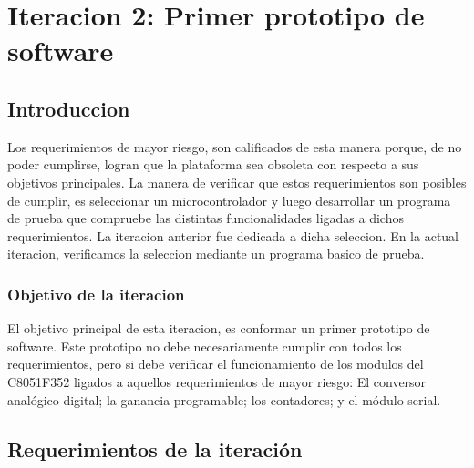 \chapter{Iteracion 2: Primer prototipo de software} %
\label{cha:iteracion_2}

\section{Introduccion} %
\label{it2:sec:introduccion}


Los requerimientos de mayor riesgo, son calificados de esta manera porque, de no poder cumplirse, logran que la plataforma sea obsoleta con respecto a sus objetivos principales. La manera de verificar que estos requerimientos son posibles de cumplir, es seleccionar un microcontrolador y luego desarrollar un programa de prueba que compruebe las distintas funcionalidades ligadas a dichos requerimientos. La iteracion anterior fue dedicada a dicha seleccion. En la actual iteracion, verificamos la seleccion mediante un programa basico de prueba.

\subsection{Objetivo de la iteracion} %
\label{sub:objetivo_de_la_iteracion}

El objetivo principal de esta iteracion, es conformar un primer prototipo de software. Este prototipo no debe necesariamente cumplir con todos los requerimientos, pero si debe verificar el funcionamiento de los modulos del C8051F352 ligados a aquellos requerimientos de mayor riesgo: El conversor analógico-digital; la ganancia programable; los contadores; y el módulo serial.




\section{Requerimientos de la iteración} %
\label{it2:sec:requerimientos_de_la_iteracion}

